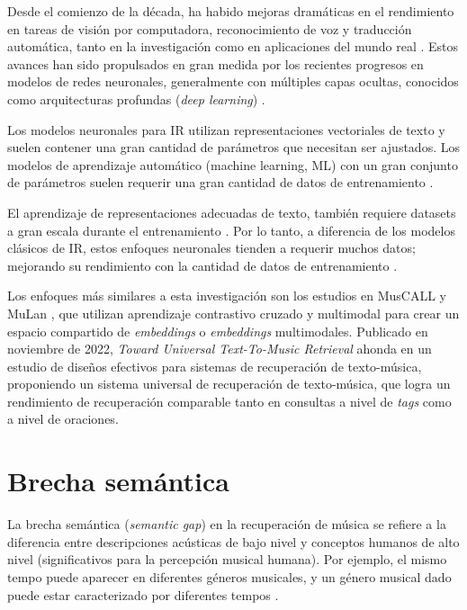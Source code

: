 Desde el comienzo de la década, ha habido mejoras dramáticas en el rendimiento en tareas de visión por computadora, reconocimiento de voz y traducción automática, tanto en la investigación como en aplicaciones del mundo real \cite{LeCun2015DeepL}. Estos avances han sido propulsados en gran medida por los recientes progresos en modelos de redes neuronales, generalmente con múltiples capas ocultas, conocidos como arquitecturas profundas (\textit{deep learning}) \cite{LeCun2015DeepL, Bahdanau2014NeuralMT, Deng2014DeepLM, Hinton2012DeepNN}. 

Los modelos neuronales para IR utilizan representaciones vectoriales de texto y suelen contener una gran cantidad de parámetros que necesitan ser ajustados. Los modelos de aprendizaje automático (machine learning, ML) con un gran conjunto de parámetros suelen requerir una gran cantidad de datos de entrenamiento \cite{Taylor2006OptimisationMF}.

El aprendizaje de representaciones adecuadas de texto, también requiere datasets a gran escala durante el entrenamiento \cite{Mitra2016LearningTM}. Por lo tanto, a diferencia de los modelos clásicos de IR, estos enfoques neuronales tienden a requerir muchos datos; mejorando su rendimiento con la cantidad de datos de entrenamiento \cite{Mitra2017NeuralMF}.

Los enfoques más similares a esta investigación son los estudios en MusCALL \cite{Manco2022ContrastiveAL} y MuLan \cite{Huang2022MuLanAJ}, que utilizan aprendizaje contrastivo cruzado y multimodal para crear un espacio compartido de \textit{embeddings} o \textit{embeddings} multimodales. Publicado en noviembre de 2022, \textit{Toward Universal Text-To-Music Retrieval} \cite{Doh2022TowardUT} ahonda en un estudio de diseños efectivos para sistemas de recuperación de texto-música, proponiendo un sistema universal de recuperación de texto-música, que logra un rendimiento de recuperación comparable tanto en consultas a nivel de \textit{tags} como a nivel de oraciones.

\section{Brecha semántica}
\label{sec:semantic-gap}

La brecha semántica (\textit{semantic gap}) en la recuperación de música se refiere a la diferencia entre descripciones acústicas de bajo nivel y conceptos humanos de alto nivel (significativos para la percepción musical humana). Por ejemplo, el mismo tempo puede aparecer en diferentes géneros musicales, y un género musical dado puede estar caracterizado por diferentes tempos \cite{Su2022HighperformanceCM}.

